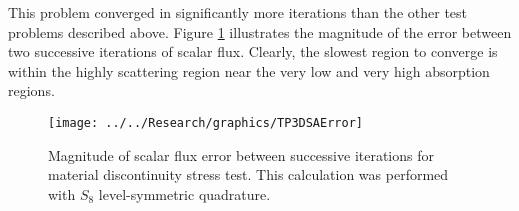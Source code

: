 \documentclass{article}
\begin{document}
\FloatBarrier

This problem converged in significantly more iterations than the other test problems described above. Figure \ref{fig:TP3DSAError} illustrates the magnitude of the error between two successive iterations of scalar flux. Clearly, the slowest region to converge is within the highly scattering region near the very low and very high absorption regions.

\begin{figure}[!h]
\centering
\texttt{[image: ../../Research/graphics/TP3DSAError]}
\caption{Magnitude of scalar flux error between successive iterations for material discontinuity stress test. This calculation was performed with $S_8$ level-symmetric quadrature.}
\label{fig:TP3DSAError}
\end{figure}

\FloatBarrier
\end{document}
